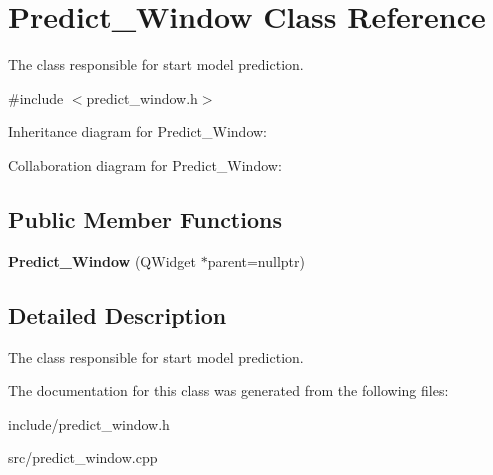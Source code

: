 \hypertarget{classPredict__Window}{}\section{Predict\+\_\+\+Window Class Reference}
\label{classPredict__Window}


The class responsible for start model prediction.  




{\ttfamily \#include $<$predict\+\_\+window.\+h$>$}



Inheritance diagram for Predict\+\_\+\+Window\+:


Collaboration diagram for Predict\+\_\+\+Window\+:
\subsection*{Public Member Functions}
\begin{DoxyCompactItemize}
\item 
\mbox{\label{classPredict__Window_a3393ac1ddc257b0cc9b5cd0443a18fb8}} 
{\bfseries Predict\+\_\+\+Window} (Q\+Widget $\ast$parent=nullptr)
\end{DoxyCompactItemize}


\subsection{Detailed Description}
The class responsible for start model prediction. 

The documentation for this class was generated from the following files\+:\begin{DoxyCompactItemize}
\item 
include/predict\+\_\+window.\+h\item 
src/predict\+\_\+window.\+cpp\end{DoxyCompactItemize}
